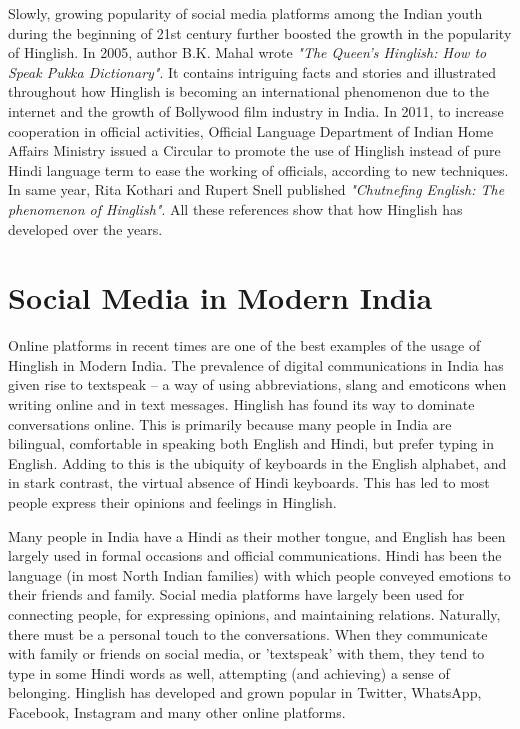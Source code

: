 \documentclass{article}
\begin{document}
Slowly, growing popularity of social media platforms among the Indian youth during the beginning of 21st century further boosted the growth in the popularity of Hinglish. In 2005, author B.K. Mahal wrote \textit{"The Queen's Hinglish: How to Speak Pukka Dictionary"}. It contains intriguing facts and stories and illustrated throughout how Hinglish is becoming an international phenomenon due to the internet and the growth of Bollywood film industry in India. In 2011, to increase cooperation in official activities, Official Language Department of Indian Home Affairs Ministry issued a Circular to promote the use of Hinglish instead of pure Hindi language term to ease the working of officials, according to new techniques. In same year, Rita Kothari and Rupert Snell published \textit{"Chutnefing English: The phenomenon of Hinglish"}. All these references show that how Hinglish has developed over the years.

\section {Social Media in Modern India}
Online platforms in recent times are one of the best examples of the usage of Hinglish in Modern India. The prevalence of digital communications in India has given rise to textspeak – a way of using abbreviations, slang and emoticons when writing online and in text messages. Hinglish has found its way to dominate conversations online. This is primarily because many people in India are bilingual, comfortable in speaking both English and Hindi, but prefer typing in English. Adding to this is the ubiquity of keyboards in the English alphabet, and in stark contrast, the virtual absence of Hindi keyboards. This has led to most people express their opinions and feelings in Hinglish. 

Many people in India have a Hindi as their mother tongue, and English has been largely used in formal occasions and official communications. Hindi has been the language (in most North Indian families) with which people conveyed emotions to their friends and family. Social media platforms have largely been used for connecting people, for expressing opinions, and maintaining relations. Naturally, there must be a personal touch to the conversations. When they communicate with family or friends on social media, or 'textspeak' with them, they tend to type in some Hindi words as well, attempting (and achieving) a sense of belonging. Hinglish has developed and grown popular in Twitter, WhatsApp, Facebook, Instagram and many other online platforms.
\end{document}
